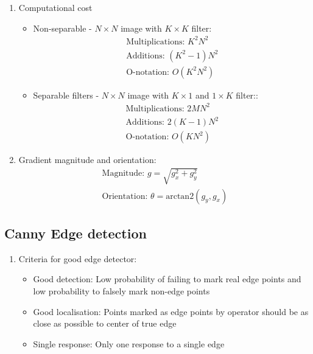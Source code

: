 \documentclass[9pt]{article}
\begin{document}
\begin{multicols*}{2}
\begin{enumerate}
            \item  Computational cost 
            \begin{itemize}
                \item Non-separable - $N \times N$ image with $K \times K$ filter:
                \begin{gather*}
                    \text{Multiplications: } K^2 N^2 \\ 
                    \text{Additions: } (K^2 - 1) N^2 \\ 
                    \text{O-notation: } O(K^2 N^2)
                \end{gather*}

                \item Separable filters - $N \times N$ image with $K \times 1$ and $1 \times K$ filter:: 
                \begin{gather*}
                    \text{Multiplications: } 2M N^2 \\ 
                    \text{Additions: } 2(K - 1) N^2 \\ 
                    \text{O-notation: } O(K N^2)
                \end{gather*}
            \end{itemize}

            \item Gradient magnitude and orientation: 
            \begin{gather*}
                \text{Magnitude: } g = \sqrt{g_x^2 + g_y^2} \\
                \text{Orientation: } \theta = \text{arctan2}(g_y, g_x)
            \end{gather*}
        \end{enumerate}

        \subsection{Canny Edge detection}
        \begin{enumerate}
            \item Criteria for good edge detector:
            \begin{itemize}
                \item Good detection: Low probability of failing to mark real edge points and low probability to falsely mark non-edge points 
                \item Good localisation: Points marked as edge points by operator should be as close as possible to center of true edge 
                \item Single response: Only one response to a single edge 
            \end{itemize}


\end{enumerate}
\end{multicols*}
\end{document}
